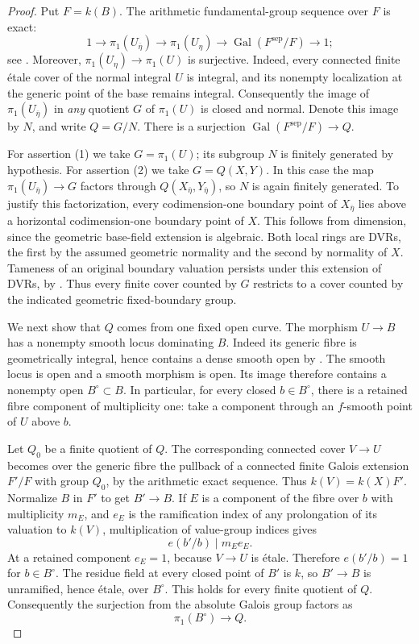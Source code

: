 \begin{proof}
Put $F=k(B)$.  The arithmetic fundamental-group sequence
over $F$ is exact:
\[
 1\longrightarrow\pi_1(U_{\overline\eta})
  \longrightarrow\pi_1(U_\eta)
  \longrightarrow\operatorname{Gal}(F^{\mathrm{sep}}/F)
  \longrightarrow1;
\]
see \cite[Lemma 58.14.3, tag 0BTX]{C_StacksGenericFibre}.
Moreover, $\pi_1(U_\eta)\to\pi_1(U)$ is surjective.
Indeed, every connected finite \'etale cover of the normal
integral $U$ is integral, and its nonempty localization at
the generic point of the base remains integral.
Consequently the image of $\pi_1(U_{\overline\eta})$ in
\emph{any} quotient $G$ of $\pi_1(U)$ is closed and normal.
Denote this image by $N$, and write $Q=G/N$.  There is a
surjection $\operatorname{Gal}(F^{\mathrm{sep}}/F)\to Q$.

For assertion (1) we take $G=\pi_1(U)$; its subgroup $N$
is finitely generated by hypothesis.  For assertion (2)
we take $G=Q(X,Y)$.  In this case the map
$\pi_1(U_{\overline\eta})\to G$ factors through
$Q(X_{\overline\eta},Y_{\overline\eta})$, so $N$ is again
finitely generated.  To justify this factorization, every
codimension-one boundary point of $X_{\overline\eta}$ lies
above a horizontal codimension-one boundary point of $X$.
This follows from dimension, since the geometric base-field
extension is algebraic.  Both local rings are DVRs, the
first by the assumed geometric normality and the second
by normality of $X$.  Tameness of an original boundary
valuation persists under this extension of DVRs, by
\cite[Lemma 15.116.9, tag 0EXY]{C_StacksLogFibration}.
Thus every finite cover counted by $G$ restricts to a
cover counted by the indicated geometric fixed-boundary
group.

We next show that $Q$ comes from one fixed open curve.
The morphism $U\to B$ has a nonempty smooth locus dominating
$B$.  Indeed its generic fibre is geometrically integral,
hence contains a dense smooth open by
\cite[Lemma 33.25.7, tag 056V]{C_StacksGenericFibre}.
The smooth locus is open and a smooth morphism is open.
Its image therefore contains a nonempty open
$B^\circ\subset B$.  In particular, for every closed
$b\in B^\circ$, there is a retained fibre component of
multiplicity one: take a component through an $f$-smooth
point of $U$ above $b$.

Let $Q_0$ be a finite quotient of $Q$.  The corresponding
connected cover $V\to U$ becomes over the generic fibre
the pullback of a connected finite Galois extension
$F'/F$ with group $Q_0$, by the arithmetic exact sequence.
Thus $k(V)=k(X)F'$.  Normalize $B$ in $F'$ to get
$B'\to B$.  If $E$ is a component of the fibre over $b$
with multiplicity $m_E$, and $e_E$ is the ramification
index of any prolongation of its valuation to $k(V)$,
multiplication of value-group indices gives
\[
                         e(b'/b)\mid m_Ee_E.
\tag{D.GF.1}
\]
At a retained component $e_E=1$, because $V\to U$ is
\'etale.  Therefore $e(b'/b)=1$ for $b\in B^\circ$.
The residue field at every closed point of $B'$ is $k$,
so $B'\to B$ is unramified, hence \'etale, over $B^\circ$.
This holds for every finite quotient of $Q$.  Consequently
the surjection from the absolute Galois group factors as
\[
                         \pi_1(B^\circ)\longrightarrow Q.
\]


\end{proof}
